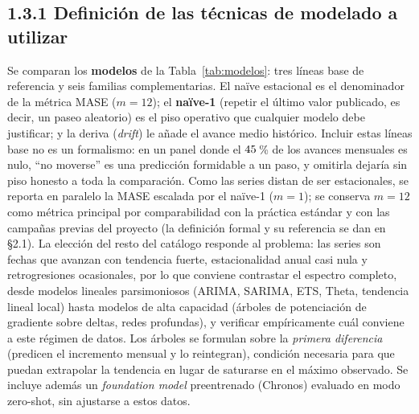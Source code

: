 \documentclass[12pt,letterpaper]{report}
\begin{document}
\subsection{1.3.1 Definición de las técnicas de modelado a utilizar}

Se comparan los \textbf{\factNModels{} modelos} de la Tabla~\ref{tab:modelos}: tres líneas base de
referencia y seis familias complementarias. El naïve estacional es el denominador de la
métrica MASE ($m=12$); el \textbf{naïve-1} (repetir el último valor publicado, es decir,
un paseo aleatorio) es el piso operativo que cualquier modelo debe justificar; y la
deriva (\textit{drift}) le añade el avance medio histórico. Incluir estas líneas base no
es un formalismo: en un panel donde el $45$\,\% de los avances mensuales es
nulo, ``no moverse'' es una predicción formidable a un paso, y omitirla dejaría sin
piso honesto a toda la comparación. Como las series distan de ser estacionales, se
reporta en paralelo la MASE escalada por el naïve-1 ($m=1$); se conserva $m=12$ como
métrica principal por comparabilidad con la práctica estándar y con las campañas
previas del proyecto (la definición formal y su referencia se dan en §2.1). La elección del resto del catálogo responde al problema:
las series son fechas que avanzan con tendencia fuerte, estacionalidad anual casi nula y
retrogresiones ocasionales, por lo que conviene contrastar el espectro completo,
desde modelos lineales parsimoniosos (ARIMA, SARIMA, ETS, Theta, tendencia lineal
local) hasta modelos de alta capacidad (árboles de potenciación de gradiente sobre
deltas, redes profundas), y verificar empíricamente cuál conviene a este régimen de
datos. Los árboles se formulan sobre la \textit{primera diferencia} (predicen el
incremento mensual y lo reintegran), condición necesaria para que puedan extrapolar la
tendencia en lugar de saturarse en el máximo observado. Se incluye además un
\textit{foundation model} preentrenado (Chronos) evaluado en modo zero-shot, sin
ajustarse a estos datos.
\end{document}
